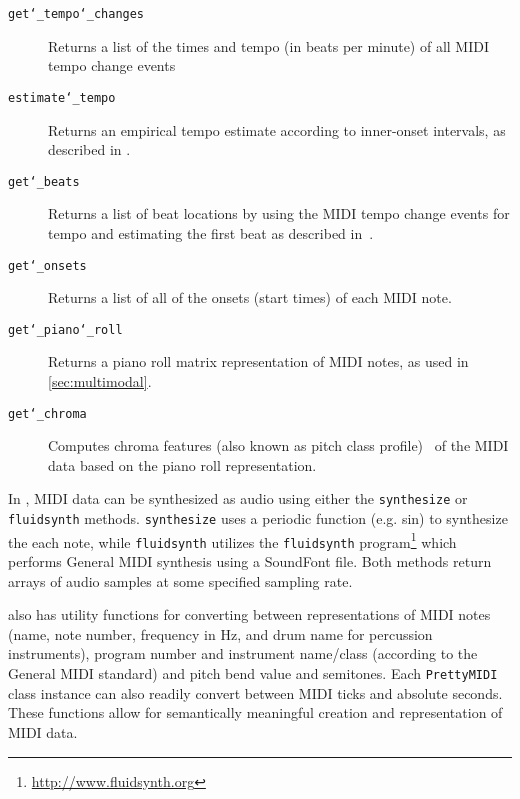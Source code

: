 \begin{description}
  \item[\texttt{get\char`_tempo\char`_changes}] Returns a list of the times and tempo (in beats per minute) of all MIDI tempo change events
  \item[\texttt{estimate\char`_tempo}] Returns an empirical tempo estimate according to inner-onset intervals, as described in \cite{dixon2001automatic}.
  \item[\texttt{get\char`_beats}] Returns a list of beat locations by using the MIDI tempo change events for tempo and estimating the first beat as described in~\cite{dixon2001automatic}.
  \item[\texttt{get\char`_onsets}] Returns a list of all of the onsets (start times) of each MIDI note.
  \item[\texttt{get\char`_piano\char`_roll}] Returns a piano roll matrix representation of MIDI notes, as used in \cref{sec:multimodal}.
  \item[\texttt{get\char`_chroma}] Computes chroma features (also known as pitch class profile)~\cite{fujishima1999realtime} of the MIDI data based on the piano roll representation.
\end{description}

In \prettymidi{}, MIDI data can be synthesized as audio using either the \texttt{synthesize} or \texttt{fluidsynth} methods.
\texttt{synthesize} uses a periodic function (e.g. sin) to synthesize the each note, while \texttt{fluidsynth} utilizes the \texttt{fluidsynth} program\footnote{\url{http://www.fluidsynth.org}} which performs General MIDI synthesis using a SoundFont file.
Both methods return arrays of audio samples at some specified sampling rate.

\prettymidi{} also has utility functions for converting between representations of MIDI notes (name, note number, frequency in Hz, and drum name for percussion instruments), program number and instrument name/class (according to the General MIDI standard) and pitch bend value and semitones.
Each \texttt{PrettyMIDI} class instance can also readily convert between MIDI ticks and absolute seconds.
These functions allow for semantically meaningful creation and representation of MIDI data.
